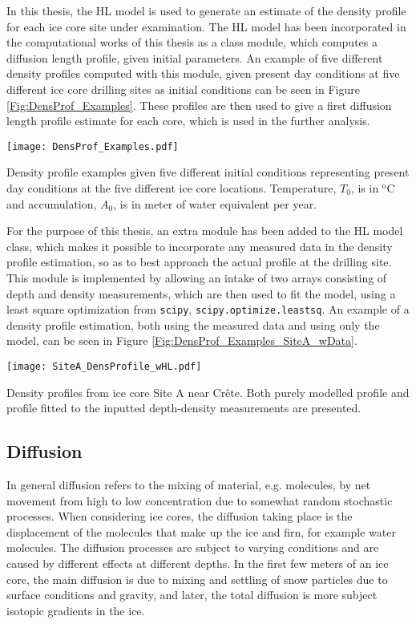 \documentclass[../../CompleteThesis2/Complete_2ndDraft]{subfiles}
\begin{document}
In this thesis, the HL model is used to generate an estimate of the density profile for each ice core site under examination. The HL model has been incorporated in the computational works of this thesis as a class module, which computes a diffusion length profile, given initial parameters. An example of five different density profiles computed with this module, given present day conditions at five different ice core drilling sites as initial conditions can be seen in Figure \ref{Fig:DensProf_Examples}. These profiles are then used to give a first diffusion length profile estimate for each core, which is used in the further analysis. 
\begin{marginfigure}
	\centering
	\texttt{[image: DensProf\_Examples.pdf]}
	\caption[Five theoretical density profile examples.]{\footnotesize Density profile examples given five different initial conditions representing present day conditions at the five different ice core locations. Temperature, $T_0$, is in $^{\text{o}}$C and accumulation, $A_0$, is in meter of water equivalent per year.}
	\label{Fig:DensProf_Examples}
\end{marginfigure}
For the purpose of this thesis, an extra module has been added to the HL model class, which makes it possible to incorporate any measured data in the density profile estimation, so as to best approach the actual profile at the drilling site. This module is implemented by allowing an intake of two arrays consisting of depth and density measurements, which are then used to fit the model, using a least square optimization from \lstinline[language=python]|scipy|, \lstinline[language=python]|scipy.optimize.leastsq|. An example of a density profile estimation, both using the measured data and using only the model, can be seen in Figure \ref{Fig:DensProf_Examples_SiteA_wData}.
\begin{marginfigure}
	\centering
	\texttt{[image: SiteA\_DensProfile\_wHL.pdf]}
	\caption[Site A density profile, data and theory.]{\footnotesize Density profiles from ice core Site A near Crête. Both purely modelled profile and profile fitted to the inputted depth-density measurements are presented.}
	\label{Fig:DensProf_Examples_SiteA_wData}
\end{marginfigure}




\subsection[Diffusion]{Diffusion}
\label{Subsec:Ice_DiffusionAndDensification_Diffusion}
In general diffusion refers to the mixing of material, e.g. molecules, by net movement from high to low concentration due to somewhat random stochastic processes. When considering ice cores, the diffusion taking place is the displacement of the molecules that make up the ice and firn, for example water molecules. The diffusion processes are subject to varying conditions and are caused by different effects at different depths. In the first few meters of an ice core, the main diffusion is due to mixing and settling of snow particles due to surface conditions and gravity, and later, the total diffusion is more subject isotopic gradients in the ice. 
\end{document}
